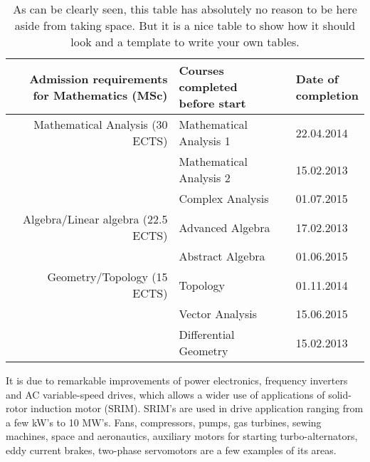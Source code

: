 \begin{table}
	\begin{tabular}{rll} \toprule
		\parbox[t]{5cm}{\textbf{Admission requirements                            \\ for Mathematics (MSc)}}  & \parbox[t]{5cm}{\textbf{Courses completed \\ before start}} & \parbox[t]{2.5cm}{\textbf{Date of \\ completion}} \\  \midrule
		Mathematical Analysis (30 ECTS)    & Mathematical Analysis 1 & 22.04.2014 \\
		~                                  & Mathematical Analysis 2 & 15.02.2013 \\
		~                                  & Complex Analysis        & 01.07.2015 \\ \midrule
		Algebra/Linear algebra (22.5 ECTS) & Advanced Algebra        & 17.02.2013 \\
		~                                  & Abstract Algebra        & 01.06.2015 \\ \midrule
		Geometry/Topology (15 ECTS)        & Topology                & 01.11.2014 \\
		~                                  & Vector Analysis         & 15.06.2015 \\
		~                                  & Differential Geometry   & 15.02.2013 \\ \bottomrule
	\end{tabular}
	\caption{As can be clearly seen, this table has absolutely no reason to be here aside from
		taking space. But it is a nice table to show how it should look and a template to write your
		own tables.}
\end{table}

It is due to remarkable improvements of power electronics, frequency inverters and AC
variable-speed drives, which allows a wider use of applications of solid-rotor induction motor
(SRIM). SRIM's are used in drive application ranging from a few kW's to 10 MW's. Fans,
compressors, pumps, gas turbines, sewing machines, space and aeronautics, auxiliary motors for
starting turbo-alternators, eddy current brakes, two-phase servomotors are a few examples of its
areas. \\

